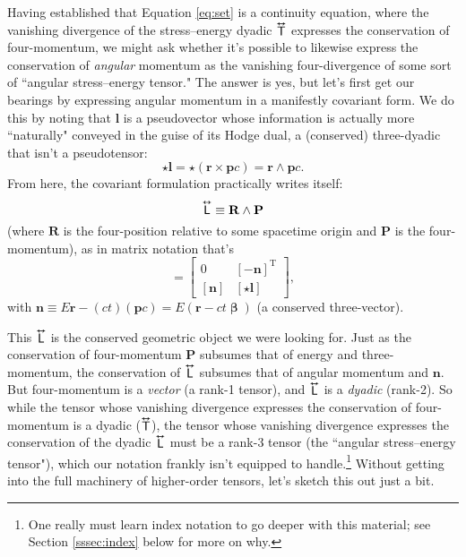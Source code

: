 \documentclass[12pt]{article}
\renewcommand{\vv}[1]{\mathbf{#1}}
\newcommand{\vvbeta}{\bm{\upbeta}}
\newcommand{\tightoverset}[2]{%
  \mathop{#2}\limits^{\vbox to -.5ex{\kern-0.75ex\hbox{$#1$}\vss}}}
\newcommand{\inlinedy}[1]{\tightoverset{\text{\tiny$\bm\leftrightarrow$}}{#1}}
\newcommand{\capdy}[1]{ \overset{ \text{\tiny$\bm\leftrightarrow$} }{\vphantom{\text{\small{A}}}\smash{#1}} }
\begin{document}
Having established that Equation \ref{eq:set} is a continuity equation, where the vanishing divergence of the stress--energy dyadic $\inlinedy{\mathsf{T}}$ expresses the conservation of four-momentum, we might ask whether it's possible to likewise express the conservation of \emph{angular} momentum as the vanishing four-divergence of some sort of ``angular stress--energy tensor." The answer is yes, but let's first get our bearings by expressing angular momentum in a manifestly covariant form. We do this by noting that $\vv l$ is a pseudovector whose information is actually more ``naturally" conveyed in the guise of its Hodge dual, a (conserved) three-dyadic that isn't a pseudotensor:
\begin{equation*}
\star \vv l =  \star ( \vv r \times \vv p c ) = \vv r \wedge \vv p c .
\end{equation*}
From here, the covariant formulation practically writes itself:
\begin{equation*}
\capdy{\mathsf{L}} \equiv \vv R \wedge \vv P
\end{equation*}
(where $\vv R$ is the four-position relative to some spacetime origin and $\vv P$ is the four-momentum), as in matrix notation that's
\begin{equation*}
[ \capdy{\mathsf{L}} ]
=
\begin{bmatrix}
0 & [ - \vv n ]^\mathrm{T} \\[1ex]
[ \vv n ] & [ \star \vv l ]
\end{bmatrix} ,
\end{equation*}
with $\vv n \equiv E \vv r - (ct)(\vv p c) = E (  \vv r - ct \vvbeta )$ (a conserved three-vector).

This $\inlinedy{\mathsf{L}}$ is the conserved geometric object we were looking for. Just as the conservation of four-momentum $\vv P$ subsumes that of energy and three-momentum, the conservation of $\inlinedy{\mathsf{L}}$ subsumes that of angular momentum and $\vv n$. But four-momentum is a \emph{vector} (a rank-1 tensor), and $\inlinedy{\mathsf{L}}$ is a \emph{dyadic} (rank-2). So while the tensor whose vanishing divergence expresses the conservation of four-momentum is a dyadic ($\inlinedy{\mathsf{T}}$), the tensor whose vanishing divergence expresses the conservation of the dyadic $\inlinedy{\mathsf{L}}$ must be a rank-3 tensor (the ``angular stress--energy tensor"), which our notation frankly isn't equipped to handle.\footnote{One really must learn index notation to go deeper with this material; see Section \ref{sssec:index} below for more on why.} Without getting into the full machinery of higher-order tensors, let's sketch this out just a bit.
\end{document}

